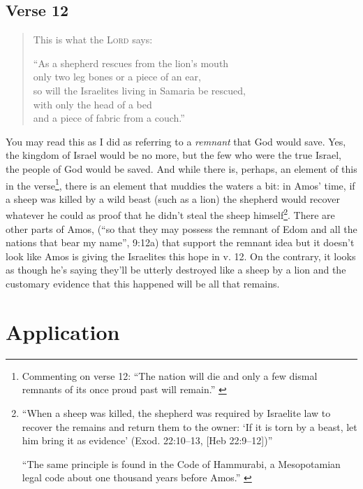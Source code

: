 \subsection{Verse 12}

\VerseQuoteStyle
\begin{quote}
    This is what the \textsc{Lord} says:

    \VerseIndent\enquote{As a shepherd rescues from the lion's mouth\\
    \VerseIndent\VerseIndent only two leg bones or a piece of an ear,\\
    \VerseIndent so will the Israelites living in Samaria be rescued,\\
    \VerseIndent\VerseIndent with only the head of a bed\\
    \VerseIndent\VerseIndent and a piece of fabric from a couch.}
\end{quote}
\NormalQuoteStyle

You may read this as I did as referring to a \textit{remnant} that God would
save. Yes, the kingdom of Israel would be no more, but the few who were the true
Israel, the people of God would be saved. And while there is, perhaps, an
element of this in the verse\footnote{%
    Commenting on verse 12: \enquote{The nation will die and only a few dismal
    remnants of its once proud past will remain.}
    \autocite[386]{mccomiskey:2009}
}, there is an element that muddies the waters a bit: in Amos' time, if a sheep
was killed by a wild beast (such as a lion) the shepherd would recover whatever
he could as proof that he didn't steal the sheep himself\footnote{%
    \enquote{When a sheep was killed, the shepherd was required by Israelite law
    to recover the remains and return them to the owner: \enquote{If it is torn
    by a beast, let him bring it as evidence} (Exod. 22:10--13, [Heb 22:9--12])}
    \autocite[166]{smith:2017}

    \enquote{The same principle is found in the Code of Hammurabi, a
    Mesopotamian legal code about one thousand years before Amos.}
    \autocite[166, footnote]{smith:2017}
}. There are other parts of Amos, (\enquote{so that they may possess the
remnant of Edom and all the nations that bear my name}, 9:12a) that support the
remnant idea but it doesn't look like Amos is giving the Israelites this hope in
v. 12. On the contrary, it looks as though he's saying they'll be utterly
destroyed like a sheep by a lion and the customary evidence that this happened
will be all that remains.

\section{Application}

